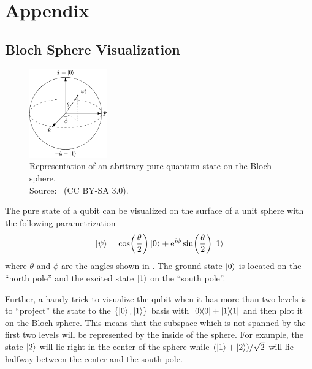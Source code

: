 \documentclass[main.tex]{subfiles}
\begin{document}
\chapter{Appendix}
\section{Bloch Sphere Visualization}%
\label{sec:bloch-sphere}
\begin{figure}[H]
    \centering
    \includegraphics[width=0.3\textwidth]{figs/bloch_sphere.png}
    \caption{Representation of an abritrary pure quantum state on the Bloch sphere.
    \\ Source:~\cite{glosser.ca_english:_2012} (CC BY-SA 3.0).
    }%
    \label{fig:bloch_sphere}
\end{figure}

The pure state of a qubit can be visualized on the surface of a unit sphere with the following parametrization
\begin{equation}
    \ket{\psi} = \cos(\frac{\theta}{2})\ket{0} + \mathrm{e}^{i\phi}\sin(\frac{\theta}{2})\ket{1}
\end{equation}
where \( \theta \) and \( \phi \) are the angles shown in .
The ground state \(\ket{0}\) is located on the ``north pole'' and the excited state \(\ket{1}\) on the ``south pole''.

Further, a handy trick to visualize the qubit when it has more than two levels is to ``project'' the state to the \(\qty{\ket{0},\ket{1}}\) basis with \( \op{0} + \op{1} \) and then plot it on the Bloch sphere.
This means that the subspace which is not spanned by the first two levels will be represented by the inside of the sphere.
For example, the state \(\ket{2}\) will lie right in the center of the sphere while \(\qty(\ket{1}+\ket{2})/\sqrt{2}\) will lie halfway between the center and the south pole.

\end{document}
